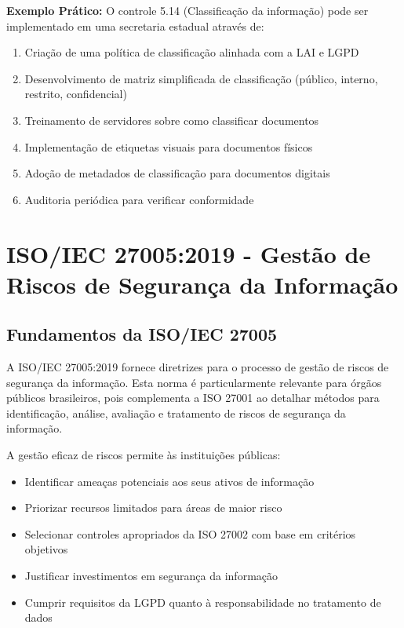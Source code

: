 \documentclass[12pt,a4paper]{report}
\begin{document}
\begin{notebox}
\textbf{Exemplo Prático:} O controle 5.14 (Classificação da informação) pode ser implementado em uma secretaria estadual através de:

\begin{enumerate}
  \item Criação de uma política de classificação alinhada com a LAI e LGPD
  \item Desenvolvimento de matriz simplificada de classificação (público, interno, restrito, confidencial)
  \item Treinamento de servidores sobre como classificar documentos
  \item Implementação de etiquetas visuais para documentos físicos
  \item Adoção de metadados de classificação para documentos digitais
  \item Auditoria periódica para verificar conformidade
\end{enumerate}
\end{notebox}

\chapter{ISO/IEC 27005:2019 - Gestão de Riscos de Segurança da Informação}

\section{Fundamentos da ISO/IEC 27005}

A ISO/IEC 27005:2019 fornece diretrizes para o processo de gestão de riscos de segurança da informação. Esta norma é particularmente relevante para órgãos públicos brasileiros, pois complementa a ISO 27001 ao detalhar métodos para identificação, análise, avaliação e tratamento de riscos de segurança da informação.

A gestão eficaz de riscos permite às instituições públicas:

\begin{itemize}
  \item Identificar ameaças potenciais aos seus ativos de informação
  \item Priorizar recursos limitados para áreas de maior risco
  \item Selecionar controles apropriados da ISO 27002 com base em critérios objetivos
  \item Justificar investimentos em segurança da informação
  \item Cumprir requisitos da LGPD quanto à responsabilidade no tratamento de dados
\end{itemize}
\end{document}
